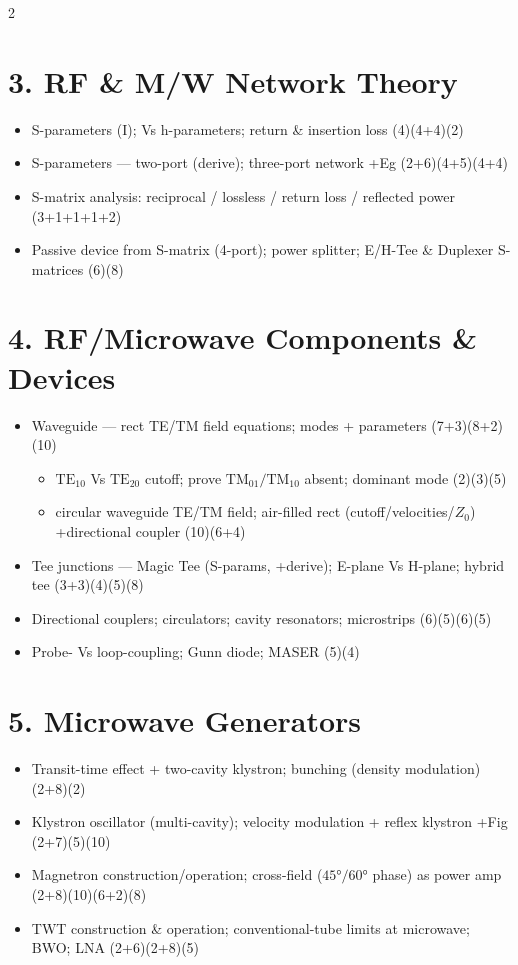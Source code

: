 \documentclass[10pt]{article}
\begin{document}
\begin{multicols}{2}
\section*{3. RF \& M/W Network Theory}
\begin{itemize}
  \item S-parameters (I); Vs h-parameters; return \& insertion loss \hfill (4)(4+4)(2)
  \item S-parameters --- two-port (derive); three-port network +Eg \hfill (2+6)(4+5)(4+4)
  \item S-matrix analysis: reciprocal / lossless / return loss / reflected power \hfill (3+1+1+1+2)
  \item Passive device from S-matrix (4-port); power splitter; E/H-Tee \& Duplexer S-matrices \hfill (6)(8)
\end{itemize}

\section*{4. RF/Microwave Components \& Devices}
\begin{itemize}
  \item Waveguide --- rect TE/TM field equations; modes + parameters \hfill (7+3)(8+2)(10)
    \begin{itemize}
      \item $\text{TE}_{10}$ Vs $\text{TE}_{20}$ cutoff; prove $\text{TM}_{01}/\text{TM}_{10}$ absent; dominant mode \hfill (2)(3)(5)
      \item circular waveguide TE/TM field; air-filled rect (cutoff/velocities/$Z_0$) +directional coupler \hfill (10)(6+4)
    \end{itemize}
  \item Tee junctions --- Magic Tee (S-params, +derive); E-plane Vs H-plane; hybrid tee \hfill (3+3)(4)(5)(8)
  \item Directional couplers; circulators; cavity resonators; microstrips \hfill (6)(5)(6)(5)
  \item Probe- Vs loop-coupling; Gunn diode; MASER \hfill (5)(4)
\end{itemize}

\section*{5. Microwave Generators}
\begin{itemize}
  \item Transit-time effect + two-cavity klystron; bunching (density modulation) \hfill (2+8)(2)
  \item Klystron oscillator (multi-cavity); velocity modulation + reflex klystron +Fig \hfill (2+7)(5)(10)
  \item Magnetron construction/operation; cross-field ($45°/60°$ phase) as power amp \hfill (2+8)(10)(6+2)(8)
  \item TWT construction \& operation; conventional-tube limits at microwave; BWO; LNA \hfill (2+6)(2+8)(5)
\end{itemize}


\end{multicols}
\end{document}
